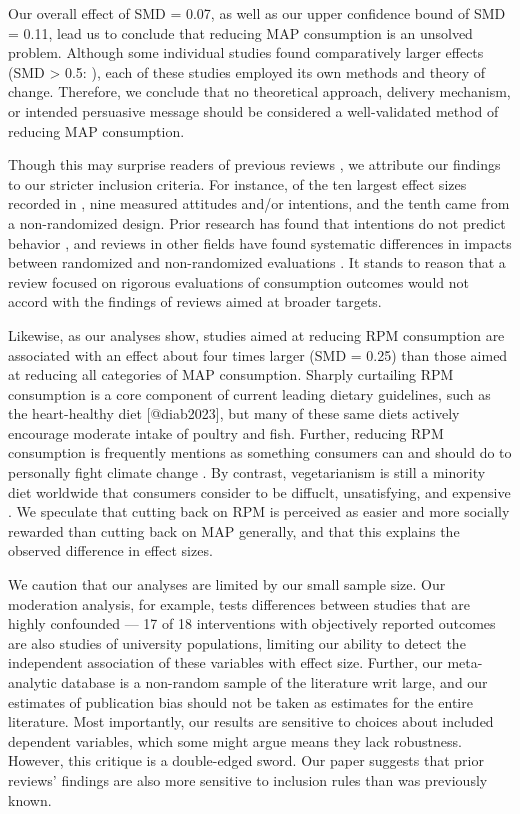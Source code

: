 \documentclass[sn-nature,referee,pdflatex]{sn-jnl}
\begin{document}
Our overall effect of SMD = 0.07, as well as our upper confidence bound
of SMD = 0.11, lead us to conclude that reducing MAP consumption is an
unsolved problem. Although some individual studies found comparatively
larger effects (SMD \textgreater{} 0.5:
\citep{carfora2023, merrill2009, kanchanachitra2020, bianchi2022, piester2020}),
each of these studies employed its own methods and theory of change.
Therefore, we conclude that no theoretical approach, delivery mechanism,
or intended persuasive message should be considered a well-validated
method of reducing MAP consumption.

Though this may surprise readers of previous reviews
\citep{mathur2021meta, meier2022, mertens2022}, we attribute our
findings to our stricter inclusion criteria. For instance, of the ten
largest effect sizes recorded in \citep{mathur2021effectiveness}, nine
measured attitudes and/or intentions, and the tenth came from a
non-randomized design. Prior research has found that intentions do not
predict behavior \citep{mathur2021effectiveness}, and reviews in other
fields have found systematic differences in impacts between randomized
and non-randomized evaluations \citep{porat2024, stevenson2023}. It
stands to reason that a review focused on rigorous evaluations of
consumption outcomes would not accord with the findings of reviews aimed
at broader targets.

Likewise, as our analyses show, studies aimed at reducing RPM
consumption are associated with an effect about four times larger (SMD =
0.25) than those aimed at reducing all categories of MAP consumption.
Sharply curtailing RPM consumption is a core component of current
leading dietary guidelines, such as the heart-healthy diet
{[}@diab2023{]}, but many of these same diets actively encourage
moderate intake of poultry and fish. Further, reducing RPM consumption
is frequently mentions as something consumers can and should do to
personally fight climate change \citep{auclair2024}. By contrast,
vegetarianism is still a minority diet worldwide \citep{tilman2014} that
consumers consider to be diffuclt, unsatisfying, and expensive
\citep{bryant2019}. We speculate that cutting back on RPM is perceived
as easier and more socially rewarded than cutting back on MAP generally,
and that this explains the observed difference in effect sizes.

We caution that our analyses are limited by our small sample size. Our
moderation analysis, for example, tests differences between studies that
are highly confounded --- 17 of 18 interventions with objectively
reported outcomes are also studies of university populations, limiting
our ability to detect the independent association of these variables
with effect size. Further, our meta-analytic database is a non-random
sample of the literature writ large, and our estimates of publication
bias should not be taken as estimates for the entire literature. Most
importantly, our results are sensitive to choices about included
dependent variables, which some might argue means they lack robustness.
However, this critique is a double-edged sword. Our paper suggests that
prior reviews' findings are also more sensitive to inclusion rules than
was previously known.
\end{document}
